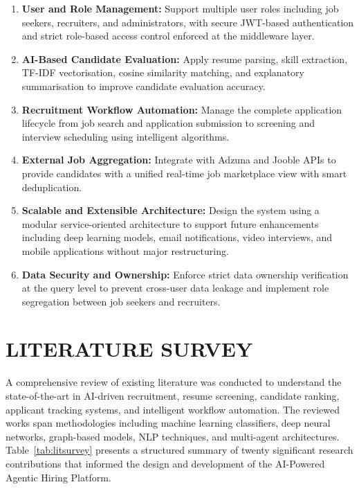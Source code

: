 \documentclass[12pt,a4paper]{report}
\begin{document}
\begin{enumerate}[leftmargin=*, label=\arabic*.]
    \item \textbf{User and Role Management:} Support multiple user roles including job seekers, recruiters, and administrators, with secure JWT-based authentication and strict role-based access control enforced at the middleware layer.
    \item \textbf{AI-Based Candidate Evaluation:} Apply resume parsing, skill extraction, TF-IDF vectorisation, cosine similarity matching, and explanatory summarisation to improve candidate evaluation accuracy.
    \item \textbf{Recruitment Workflow Automation:} Manage the complete application lifecycle from job search and application submission to screening and interview scheduling using intelligent algorithms.
    \item \textbf{External Job Aggregation:} Integrate with Adzuna and Jooble APIs to provide candidates with a unified real-time job marketplace view with smart deduplication.
    \item \textbf{Scalable and Extensible Architecture:} Design the system using a modular service-oriented architecture to support future enhancements including deep learning models, email notifications, video interviews, and mobile applications without major restructuring.
    \item \textbf{Data Security and Ownership:} Enforce strict data ownership verification at the query level to prevent cross-user data leakage and implement role segregation between job seekers and recruiters.
\end{enumerate}

\chapter{LITERATURE SURVEY}

A comprehensive review of existing literature was conducted to understand the state-of-the-art in AI-driven recruitment, resume screening, candidate ranking, applicant tracking systems, and intelligent workflow automation. The reviewed works span methodologies including machine learning classifiers, deep neural networks, graph-based models, NLP techniques, and multi-agent architectures. Table~\ref{tab:litsurvey} presents a structured summary of twenty significant research contributions that informed the design and development of the AI-Powered Agentic Hiring Platform.
\end{document}
